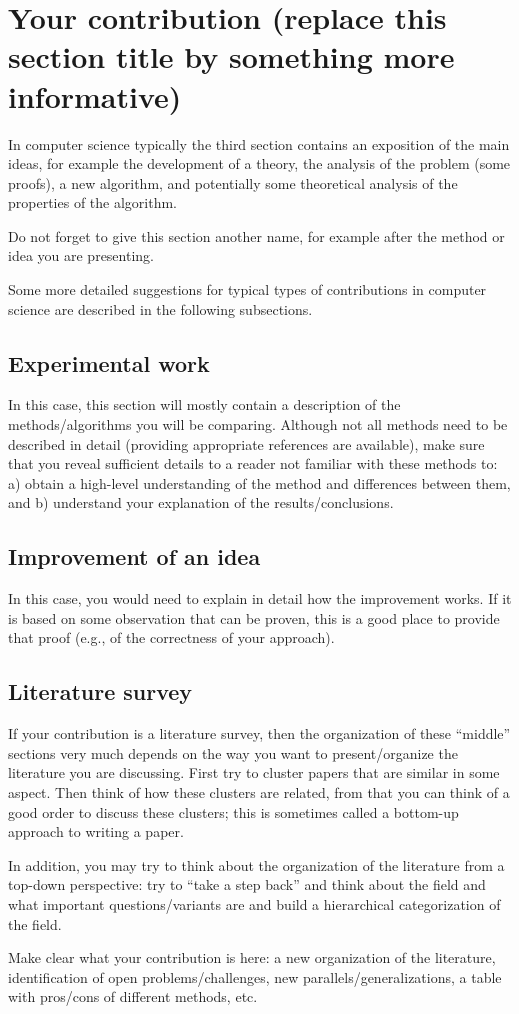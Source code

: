 \section{Your contribution (replace this section title by something more informative)}
In computer science typically the third section contains an exposition of the main ideas, for example the development of a theory, the analysis of the problem (some proofs), a new algorithm, and potentially some theoretical analysis of the properties of the algorithm.

Do not forget to give this section another name, for example after the method or idea you are presenting.

Some more detailed suggestions for typical types of contributions in computer science are described in the following subsections.


\subsection*{Experimental work}
In this case, this section will mostly contain a description of the methods/algorithms you will be comparing. Although not all methods need to be described in detail (providing appropriate references are available), make sure that you reveal sufficient details to a reader not familiar with these methods to: a) obtain a high-level understanding of the method and differences between them, and b) understand your explanation of the results/conclusions.

\subsection*{Improvement of an idea}
In this case, you would need to explain in detail how the improvement works. If it is based on some observation that can be proven, this is a good place to provide that proof (e.g., of the correctness of your approach). 

\subsection*{Literature survey}
If your contribution is a literature survey, then the organization of these ``middle'' sections very much depends on the way you want to present/organize the literature you are discussing.
First try to cluster papers that are similar in some aspect. Then think of how these clusters are related, from that you can think of a good order to discuss these clusters; this is sometimes called a bottom-up approach to writing a paper.

In addition, you may try to think about the organization of the literature from a top-down perspective: try to ``take a step back'' and think about the field and what important questions/variants are and build a hierarchical categorization of the field.

Make clear what your contribution is here: a new organization of the literature, identification of open problems/challenges, new parallels/generalizations, a table with pros/cons of different methods, etc.\ 

